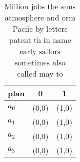 \documentclass[a4paper]{article}
\begin{document}
\begin{table}
\begin{adjustbox}{width=0.9\columnwidth}
\begin{tabular}{|l|l|l|}
\hline
\textbf{plan} & \multicolumn{1}{c|}{\textbf{0}} & \multicolumn{1}{c|}{\textbf{1}} \\ \hline
\textbf{$a_0$}  & (0,0) & (1,0) \\ \hline
\textbf{$a_1$}  & (0,0) & (1,0) \\ \hline
\textbf{$a_2$}  & (0,0) & (1,0) \\ \hline
\textbf{$a_3$}  & (0,0) & (1,0) \\ \hline
\end{tabular}
\end{adjustbox}
\caption{Million jobs the suns atmosphere and orm Paciic by letters patent th in name early sailors sometimes also called may to
}
\end{table}
\end{document}
